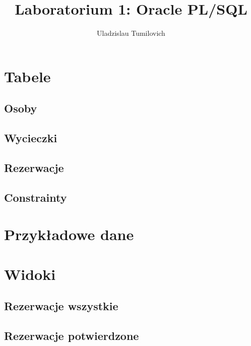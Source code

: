 \documentclass[12pt]{article}
\begin{document}
	
	\title{Laboratorium 1: Oracle PL/SQL}
	\author{Uladzislau Tumilovich}
	\date{}
	\maketitle
	\clearpage
	
	\section{Tabele}
	
	\subsection{Osoby}
	
	
	\subsection{Wycieczki}
	
	
	\subsection{Rezerwacje}
	
	
	\pagebreak
	
	\subsection{Constrainty}
	
	
	\section{Przykładowe dane}
	
	
	\pagebreak
	
	\section{Widoki}
	
	\subsection{Rezerwacje wszystkie}
	
	
	\subsection{Rezerwacje potwierdzone}
	
	
\end{document}
